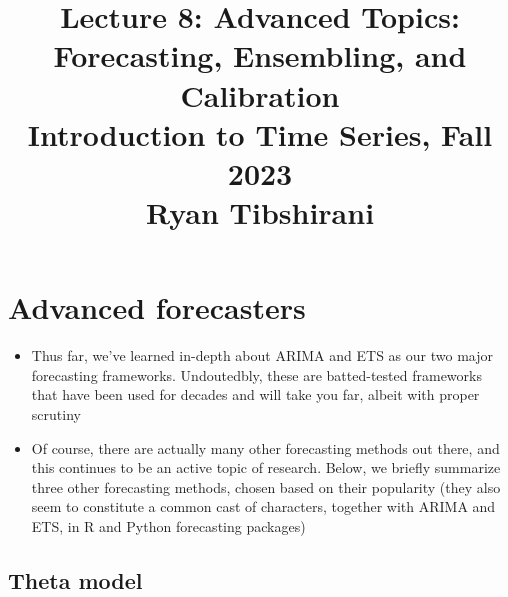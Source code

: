 \documentclass{article}
\title{Lecture 8: Advanced Topics: Forecasting, Ensembling, and Calibration \\
  \smallskip  
\large Introduction to Time Series, Fall 2023 \\ \smallskip
Ryan Tibshirani}
\date{}
\begin{document}
\maketitle
\RaggedRight
\vspace{-50pt}

\section{Advanced forecasters}

\begin{itemize}
\item Thus far, we've learned in-depth about ARIMA and ETS as our two major 
  forecasting frameworks. Undoutedbly, these are batted-tested frameworks that 
  have been used for decades and will take you far, albeit with proper scrutiny 

\item Of course, there are actually many other forecasting methods out there,
  and this continues to be an active topic of research. Below, we briefly
  summarize three other forecasting methods, chosen based on their popularity
  (they also seem to constitute a common cast of characters, together with ARIMA
  and ETS, in R and Python forecasting packages)       
\end{itemize}

\subsection{Theta model}
\end{document}
